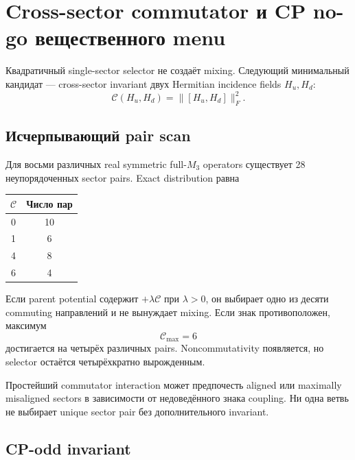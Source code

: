 \chapter{Cross-sector commutator и CP no-go вещественного menu}

Квадратичный single-sector selector не создаёт mixing. Следующий минимальный
кандидат --- cross-sector invariant двух Hermitian incidence fields
\(H_u,H_d\):
\begin{equation}
\mathcal C(H_u,H_d)=\|[H_u,H_d]\|_F^2.
\end{equation}

\section{Исчерпывающий pair scan}

Для восьми различных real symmetric full-\(M_3\) operators существует 28
неупорядоченных sector pairs. Exact distribution равна
\begin{center}
\begin{tabular}{cc}
\toprule
\(\mathcal C\) & Число пар \\
\midrule
0 & 10 \\
1 & 6 \\
4 & 8 \\
6 & 4 \\
\bottomrule
\end{tabular}
\end{center}

Если parent potential содержит \(+\lambda\mathcal C\) при \(\lambda>0\),
он выбирает одно из десяти commuting направлений и не вынуждает mixing. Если
знак противоположен, максимум
\begin{equation}
\mathcal C_{\max}=6
\end{equation}
достигается на четырёх различных pairs. Noncommutativity появляется, но
selector остаётся четырёхкратно вырожденным.

\begin{proposition}
Простейший commutator interaction может предпочесть aligned или maximally
misaligned sectors в зависимости от недоведённого знака coupling. Ни одна
ветвь не выбирает unique sector pair без дополнительного invariant.
\end{proposition}

\section{CP-odd invariant}

